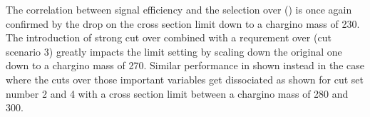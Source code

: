 The correlation between signal efficiency and the selection over \pt(\hadtau) is once again confirmed by the drop on the cross section limit down to a chargino mass of 230\gev. The introduction of strong cut over \mjj combined with a requrement over \met (cut scenario 3) greatly impacts the limit setting by scaling down the original one down to a chargino mass of 270\gev. Similar performance in shown instead in the case where the cuts over those important variables get dissociated as shown for cut set number 2 and 4 with a cross section limit between a chargino mass of 280 and 300\gev.

